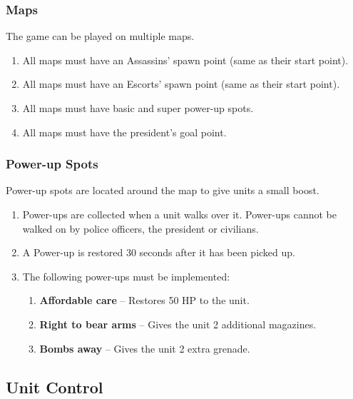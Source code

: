 \documentclass[12pt]{article}
\newenvironment{req} {\begin{enumerate}[leftmargin=2.5cm, label = \textbf{REQ \arabic{subsection}.\arabic{subsubsection}.\arabic*:}]} {\end{enumerate}}
\begin{document}
\subsubsection{Maps}
The game can be played on multiple maps.
\begin{req}
	\item All maps must have an Assassins' spawn point (same as their start point).
	\item All maps must have an Escorts' spawn point (same as their start point).
	\item All maps must have basic and super power-up spots.
	\item All maps must have the president's goal point.
\end{req}

\subsubsection{Power-up Spots}
Power-up spots are located around the map to give units a small boost.
\begin{req}
	\item Power-ups are collected when a unit walks over it. Power-ups cannot be walked on by police officers, the president or civilians. 
	\item A Power-up is restored 30 seconds after it has been picked up.
	\item The following power-ups must be implemented:
	\begin{enumerate}
		\item \textbf{Affordable care} -- Restores 50 HP to the unit.
		\item \textbf{Right to bear arms} -- Gives the unit 2 additional magazines.
		\item \textbf{Bombs away} -- Gives the unit 2 extra grenade.
	\end{enumerate}
\end{req}

\subsection{Unit Control}
\end{document}

